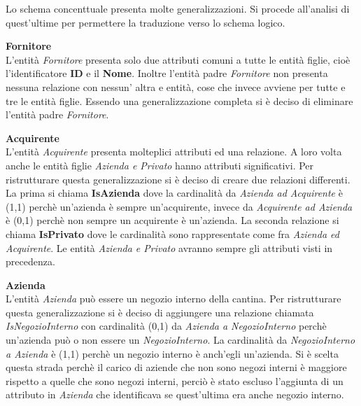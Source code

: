 Lo schema concenttuale presenta molte generalizzazioni. Si procede all'analisi di quest'ultime per permettere la traduzione verso lo schema logico.\\

\begin{flushleft}
	\textbf{\large{Fornitore}}\\
	L'entità \emph{Fornitore} presenta solo due attributi comuni a tutte le entità figlie, cioè l'identificatore \textbf{ID} e il \textbf{Nome}. Inoltre l'entità padre \emph{Fornitore} non presenta nessuna relazione con nessun' altra e entità, cose che invece avviene per tutte e tre le entità figlie. Essendo una generalizzazione completa si è deciso di eliminare l'entità padre \emph{Fornitore}. 
\end{flushleft}


\begin{flushleft}
	\textbf{\large{Acquirente}}\\
	L'entità \emph{Acquirente} presenta molteplici attributi ed una relazione. A loro volta anche le entità figlie \emph{Azienda e Privato} hanno attributi significativi. Per ristrutturare questa generalizzazione si è deciso di creare due relazioni differenti. La prima si chiama \textbf{IsAzienda} dove la cardinalità da \emph{Azienda ad Acquirente} è (1,1) perchè un'azienda è sempre un'acquirente, invece da \emph{Acquirente ad Azienda} è (0,1) perchè non sempre un acquirente è un'azienda.
	La seconda relazione si chiama \textbf{IsPrivato} dove le cardinalità sono rappresentate come fra \emph{Azienda ed Acquirente}. Le entità \emph{Azienda e Privato} avranno sempre gli attributi visti in precedenza.
\end{flushleft}

\begin{flushleft}
	\textbf{\large{Azienda}}\\
	L'entità \emph{Azienda} può essere un negozio interno della cantina. Per ristrutturare questa generalizzazione si è deciso di aggiungere una relazione chiamata \emph{IsNegozioInterno} con cardinalità (0,1) da \emph{Azienda a NegozioInterno} perchè un'azienda può o non essere un \emph{NegozioInterno}. La cardinalità da \emph{NegozioInterno a Azienda} è (1,1) perchè un negozio interno è anch'egli un'azienda. Si è scelta questa strada perchè il carico di aziende che non sono negozi interni è maggiore rispetto a quelle che sono negozi interni, perciò è stato escluso l'aggiunta di un attributo in \emph{Azienda} che identificava se quest'ultima era anche negozio interno.
\end{flushleft}


